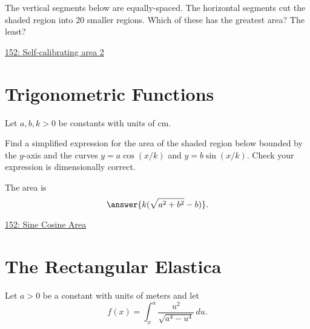 \documentclass{ximera}
\begin{document}
\begin{question} \label{QPldfefdfsdfd}

The vertical segments below are equally-spaced. The horizontal segments cut the shaded region into $20$ smaller regions. Which of these has the greatest area? The least?

\begin{onlineOnly}
    \begin{center}
\end{center}
\end{onlineOnly}

\href{https://www.desmos.com/calculator/dir9hpzvse}{152: Self-calibrating area 2}
\end{question}


\section{Trigonometric Functions}

\begin{question} \label{QLkfeREdfd}
Let $a,b,k>0$ be constants with units of cm.

Find a simplified expression for the area of the shaded region below bounded by the $y$-axis and the curves $y=a\cos (x/k)$ and $y=b\sin (x/k)$. Check your expression is dimensionally correct.

The area is
\[
      \answer{k (\sqrt{a^2 + b^2} - b)} .
\]

\begin{onlineOnly}
    \begin{center}
\end{center}
\end{onlineOnly}

\href{https://www.desmos.com/calculator/ps1m0hksl0}{152: Sine Cosine Area}
\end{question}


\section{The Rectangular Elastica}

Let $a>0$ be a constant with units of meters and let
\[
   f(x) = \int_x^a \frac{u^2}{\sqrt{a^4-u^4}} \, du .
\]
\end{document}
